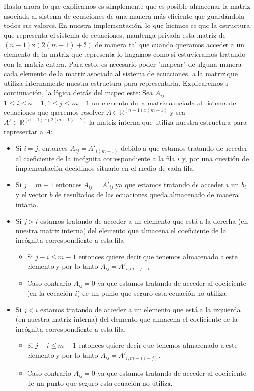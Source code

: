 \par Hasta ahora lo que explicamos es simplemente que es posible almacenar la matriz asociada al sistema de ecuaciones de una manera más eficiente que guardándola todos sus valores. En nuestra implementación, lo que hicimos es que la estructura que representa el sistema de ecuaciones, mantenga privada esta matriz de $(n - 1)$x$(2(m - 1) + 2)$ de manera tal que cuando queramos acceder a un elemento de la matriz que representa lo hagamos como si estuvieramos tratando con la matriz entera. Para esto, es necesario poder "mapear" de alguna manera cada elemento de la matriz asociada al sistema de ecuaciones, a la matriz que utiliza internamente nuestra estructura para representarla. Explicaremos a continuación, la lógica detrás del mapeo este:
\newline Sea $A_{ij}$ $1 \leq i \leq n - 1, 1 \leq j \leq m - 1$ un elemento de la matriz asociada al sistema de ecuaciones que queremos resolver $A \in \mathbb{R}^{(n - 1)x(m - 1)}$ y sea $A' \in \mathbb{R}^{(n - 1)x(2(m - 1) + 2)}$ la matriz interna que utiliza nuestra estructura para representar a $A$:
\begin{itemize}
\item Si $i = j$, entonces $A_{ij} = A'_{i (m + 1)}$ debido a que estamos tratando de acceder al coeficiente de la incógnita correspondiente a la fila $i$ y, por una cuestión de implementación decidimos situarlo en el medio de cada fila.
\item Si $j = m - 1$ entonces $A_{ij} = A'_{ij}$ ya que estamos tratando de acceder a un $b_i$ y el vector $b$ de resultados de las ecuaciones queda almacenado de manera intacta.
\item Si $j > i$ estamos tratando de acceder a un elemento que está a la derecha (en nuestra matriz interna) del elemento que almacena el coeficiente de la incógnita correspondiente a esta fila
\begin{itemize}
\item Si $j - i \leq m - 1$ entonces quiere decir que tenemos almacenado a este elemento y por lo tanto $A_{ij} = A'_{i, m + j - i}$
\item Caso contrario $A_{ij} = 0$ ya que estamos tratando de acceder al coeficiente (en la ecuación $i$) de un punto que seguro esta ecuación no utiliza.
\end{itemize}
\item Si $j < i$ estamos tratando de acceder a un elemento que está a la izquierda (en nuestra matriz interna) del elemento que almacena el coeficiente de la incógnita correspondiente a esta fila.
\begin{itemize}
\item Si $j - i \leq m - 1$ entonces quiere decir que tenemos almacenado a este elemento y por lo tanto $A_{ij} = A'_{i, m - (i - j)}$.
\item Caso contrario $A_{ij} = 0$ ya que estamos tratando de acceder al coeficiente de un punto que seguro esta ecuación no utiliza.
\end{itemize}
\end{itemize}

